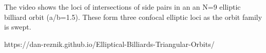 The video shows the loci of intersections of side pairs in an an N=9 elliptic billiard orbit (a/b=1.5). These form three confocal elliptic loci as the orbit family is swept.

https://dan-reznik.github.io/Elliptical-Billiards-Triangular-Orbits/